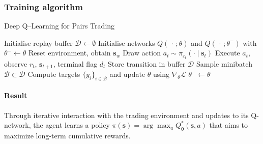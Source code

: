 \subsubsection{Training algorithm}
\begin{algorithm}[H]
\caption{Deep Q--Learning for Pairs Trading}
\label{alg:DQN}
\begin{algorithmic}[1]
\State Initialise replay buffer $\mathcal D\leftarrow\emptyset$
\State Initialise networks $Q(\,\cdot\,;\theta)$ and $Q(\,\cdot\,;\theta^{-})$ with $\theta^{-}\!\leftarrow\!\theta$
\State Reset environment, obtain $\mathbf s_w$
    \State Draw action $a_t\sim\pi_{\varepsilon_t}(\cdot\mid\mathbf s_t)$
    \State Execute $a_t$, observe $r_t$, $\mathbf s_{t+1}$, terminal flag $d_t$
    \State Store transition in buffer $\mathcal D$
        \State Sample minibatch $\mathcal B\subset\mathcal D$
        \State Compute targets $\{y_i\}_{i\in\mathcal B}$ and
               update $\theta$ using $\nabla_\theta\mathcal L$
    \EndIf
    \State $\theta^{-}\leftarrow\theta$\EndIf
\EndFor
\end{algorithmic}
\end{algorithm}

\paragraph{Result}
Through iterative interaction with the trading environment and updates to its Q-network, the agent learns a policy $\pi(\mathbf s) = \arg\max_{a} Q_{\boldsymbol{\theta}}^*(\mathbf s, a)$ that aims to maximize long-term cumulative rewards.


\Vhrulefill


